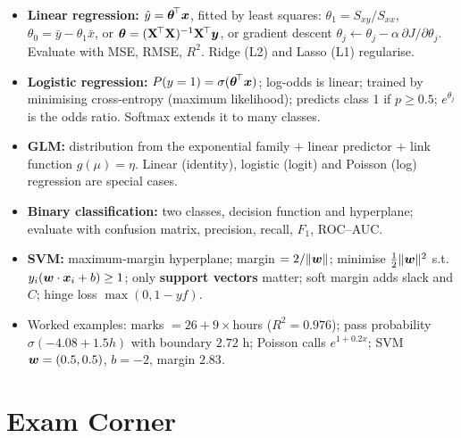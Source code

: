 \begin{summary}
\begin{itemize}
  \item \textbf{Linear regression:} $\hat y=\boldsymbol{\theta}^{\!\top}\boldsymbol{x}$, fitted by least squares: $\theta_1=S_{xy}/S_{xx}$, $\theta_0=\bar y-\theta_1\bar x$, or $\boldsymbol{\theta}=(\mathbf X^{\!\top}\mathbf X)^{-1}\mathbf X^{\!\top}\boldsymbol{y}$, or gradient descent $\theta_j\leftarrow\theta_j-\alpha\,\partial J/\partial\theta_j$. Evaluate with MSE, RMSE, $R^2$. Ridge (L2) and Lasso (L1) regularise.
  \item \textbf{Logistic regression:} $P(y=1)=\sigma(\boldsymbol{\theta}^{\!\top}\boldsymbol{x})$; log-odds is linear; trained by minimising cross-entropy (maximum likelihood); predicts class 1 if $p\ge0.5$; $e^{\theta_j}$ is the odds ratio. Softmax extends it to many classes.
  \item \textbf{GLM:} distribution from the exponential family $+$ linear predictor $+$ link function $g(\mu)=\eta$. Linear (identity), logistic (logit) and Poisson (log) regression are special cases.
  \item \textbf{Binary classification:} two classes, decision function and hyperplane; evaluate with confusion matrix, precision, recall, $F_1$, ROC--AUC.
  \item \textbf{SVM:} maximum-margin hyperplane; margin $=2/\|\boldsymbol{w}\|$; minimise $\frac12\|\boldsymbol{w}\|^2$ s.t.\ $y_i(\boldsymbol{w}\cdot\boldsymbol{x}_i+b)\ge1$; only \textbf{support vectors} matter; soft margin adds slack and $C$; hinge loss $\max(0,1-yf)$.
  \item Worked examples: marks $=26+9\times$hours ($R^2=0.976$); pass probability $\sigma(-4.08+1.5h)$ with boundary $2.72$ h; Poisson calls $e^{1+0.2x}$; SVM $\boldsymbol{w}=(0.5,0.5)$, $b=-2$, margin $2.83$.
\end{itemize}
\end{summary}

\section*{Exam Corner}

